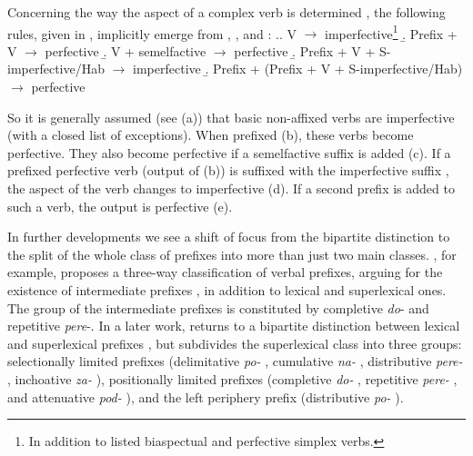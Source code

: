 Concerning the way the aspect of a complex verb is determined , the following rules, given in \cite{Borer:13}, implicitly emerge from \citet{Ramchand:04}, \citet{Romanova:04}, and \citet{Svenonius:04b}:
\ex.\label{bor}\a. V $\rightarrow$ {imperfective}\footnote{In addition to listed biaspectual and perfective simplex verbs.}
\b. Prefix + V $\rightarrow$ {perfective}
\b. V + semelfactive   $\rightarrow$ {perfective}
\b. Prefix + V + S-imperfective/Hab $\rightarrow$ {imperfective}
\b. Prefix + (Prefix + V + S-imperfective/Hab) $\rightarrow$ {perfective}

So it is generally assumed (see (a)) that basic non-affixed verbs are imperfective (with a closed list of exceptions). When prefixed (b), these verbs become perfective. They also become perfective if a semelfactive   suffix is added (c). If a prefixed perfective verb  (output of (b)) is suffixed with the imperfective suffix  , the aspect of the verb changes to imperfective (d). If a second prefix is added to such a verb, the output is perfective (e).

In further developments we see a shift of focus from the bipartite distinction to the split of the whole class of prefixes into more than just two main classes. \citet{Tatevosov:07}, for example, proposes a three-way classification  of verbal prefixes, arguing for the existence of intermediate prefixes , in addition to lexical and superlexical ones. The group of the intermediate prefixes  is constituted by completive  \textit{do}- and repetitive  \textit{pere}-. In a later work, \citet{Tatevosov:09} returns to a bipartite distinction between lexical and superlexical prefixes , but subdivides the superlexical class into three groups: selectionally limited prefixes  (delimitative  \textit{po-}  , cumulative  \textit{na-}  , distributive  \textit{pere-}  , inchoative  \textit{za-}  ), positionally limited prefixes  (completive  \textit{do-}  , repetitive  \textit{pere-}  , and attenuative  \textit{pod-}    ), and the left periphery prefix  (distributive  \textit{po-}  ).

